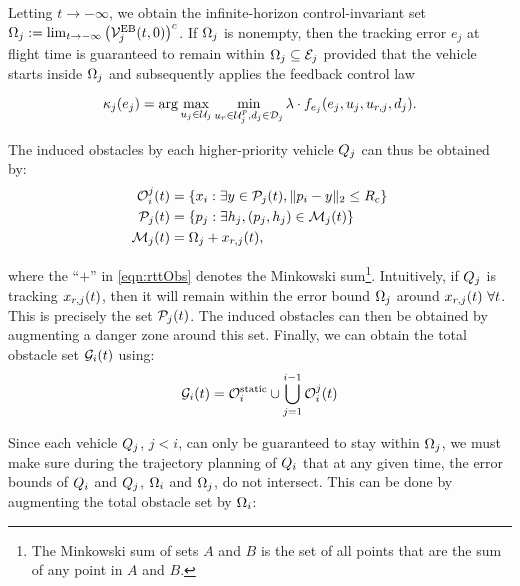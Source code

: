 Letting $t \to -\infty$, we obtain the infinite-horizon control-invariant set $\Omega_j := \lim_{t \to -\infty} \left( \mathcal{V}^{\text{EB}}_{j}(t, 0) \right)^c$. If $\Omega_j$ is nonempty, then the tracking error $e_j$ at flight time is guaranteed to remain within $\Omega_j \subseteq \mathcal{E}_j$ provided that the vehicle starts inside $\Omega_j$ and subsequently applies the feedback control law

\begin{equation}
\label{eq:robust_tracking_law}
\kappa_j(e_j) = \arg\max_{u_j \in \mathcal{U}_j} \min_{u_r \in\mathcal{U}^p_j, d_j \in \mathcal{D}_j} \lambda \cdot f_{e_j}(e_j,u_j,u_{r, j},d_j).
\end{equation}

The induced obstacles by each higher-priority vehicle $Q_j$ can thus be obtained by: 
\begin{equation} 
\label{eqn:rttObs}
\begin{aligned}
\mathcal{O}_i^j(t) &=  \{x_i: \exists y \in \mathcal{P}_j(t), \|p_i - y\|_2 \le R_c \} \\
\mathcal{P}_j(t) &= \{p_j: \exists h_j, (p_j, h_j) \in \mathcal{M}_j(t)\} \\
\mathcal{M}_j(t) &= \Omega_j  + x_{r,j}(t),
\end{aligned}
\end{equation}

\noindent where the ``$+$'' in \eqref{eqn:rttObs} denotes the Minkowski sum\footnote{The Minkowski sum of sets $A$ and $B$ is the set of all points that are the sum of any point in $A$ and $B$.}. Intuitively, if $Q_j$ is tracking $x_{r,j}(t)$, then it will remain within the error bound $\Omega_j$ around $x_{r,j}(t) ~\forall t$. This is precisely the set $\mathcal{P}_j(t)$. The induced obstacles can then be obtained by augmenting a danger zone around this set. Finally, we can obtain the total obstacle set $\mathcal{G}_i(t)$ using:
\begin{equation}
\label{eq:obsseti}
\mathcal{G}_i(t)  = \mathcal{O}^\text{static}_i \cup \bigcup_{j=1}^{i-1} \mathcal{O}_i^j(t)
\end{equation} 

Since each vehicle $Q_j$, $j<i$, can only be guaranteed to stay within $\Omega_j$, we must make sure during the trajectory planning of $Q_i$ that at any given time, the error bounds of $Q_i$ and $Q_j$, $\Omega_i$ and $\Omega_j$, do not intersect. This can be done by augmenting the total obstacle set by $\Omega_i$:%

